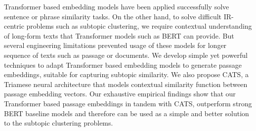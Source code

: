 Transformer based embedding models have been applied successfully solve sentence or phrase similarity tasks. On the other hand, to solve difficult IR-centric problems such as subtopic clustering, we require contextual understanding of long-form texts that Transformer models such as BERT can provide. But several engineering limitations prevented usage of these models for longer sequence of texts such as passage or documents. We develop simple yet powerful techniques to adapt Transformer based embedding models to generate passage embeddings, suitable for capturing subtopic similarity. We also propose CATS, a Triamese neural architecture that models contextual similarity function between passage embedding vectors. Our exhaustive empirical findings show that our Transformer based passage embeddings in tandem with CATS, outperform strong BERT baseline models and therefore can be used as a simple and better solution to the subtopic clustering problems.